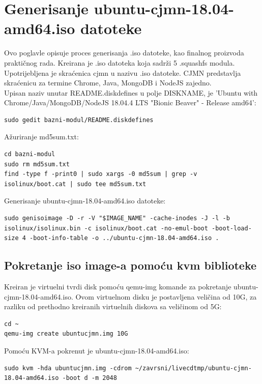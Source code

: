 \documentclass[12pt,vi]{mitthesis}
\begin{document}
\section*{Generisanje ubuntu-cjmn-18.04-amd64.iso datoteke}
\indent
Ovo poglavle opisuje proces generisanja .iso datoteke, kao finalnog proizvoda praktičnog rada. Kreirana je .iso datoteka koja sadrži 5 .squashfs modula. Upotrijebljena je skraćenica cjmn u nazivu .iso datoteke. CJMN predstavlja skraćenicu za termine Chrome, Java, MongoDB i NodeJS zajedno.\\
Upisan naziv unutar README.diskdefines u polje DISKNAME, je 'Ubuntu with Chrome/Java/MongoDB/NodeJS 18.04.4 LTS "Bionic Beaver" - Release amd64':
\begin{lstlisting}[style=BashInputStyle]
sudo gedit bazni-modul/README.diskdefines
\end{lstlisting}
\noindent
Ažuriranje md5sum.txt:
\begin{lstlisting}[style=BashInputStyle]
cd bazni-modul
sudo rm md5sum.txt
find -type f -print0 | sudo xargs -0 md5sum | grep -v isolinux/boot.cat | sudo tee md5sum.txt
\end{lstlisting}
\noindent
Generisanje ubuntu-cjmn-18.04-amd64.iso datoteke:
\begin{lstlisting}[style=BashInputStyle]
sudo genisoimage -D -r -V "$IMAGE_NAME" -cache-inodes -J -l -b isolinux/isolinux.bin -c isolinux/boot.cat -no-emul-boot -boot-load-size 4 -boot-info-table -o ../ubuntu-cjmn-18.04-amd64.iso .
\end{lstlisting}

\subsection*{Pokretanje iso image-a pomoću kvm biblioteke}
\indent
Kreiran je virtuelni tvrdi disk pomoću qemu-img komande za pokretanje ubuntu-cjmn-18.04-amd64.iso. Ovom virtuelnom disku je postavljena veličina od 10G, za razliku od prethodno kreiranih virtuelnih diskova sa veličinom od 5G:
\begin{lstlisting}[style=BashInputStyle]
cd ~
qemu-img create ubuntucjmn.img 10G
\end{lstlisting}

\noindent 
Pomoću KVM-a pokrenut je ubuntu-cjmn-18.04-amd64.iso:
\begin{lstlisting}[style=BashInputStyle]
sudo kvm -hda ubuntucjmn.img -cdrom ~/zavrsni/livecdtmp/ubuntu-cjmn-18.04-amd64.iso -boot d -m 2048
\end{lstlisting}
\end{document}
